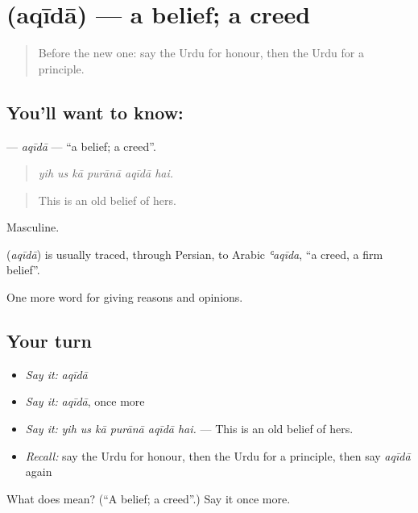 \section[\texorpdfstring{\ur{عقیدہ} (aqīdā)}{عقیدہ (aqīdā)}]{ (aqīdā) — a belief; a creed}

\label{lesson:UR-C345-aqida}



\begin{quote}
Before the new one: say the Urdu for honour, then the Urdu for a principle.
\end{quote}

\subsection*{You'll want to know: }
\textbf{} — \emph{aqīdā} — \textquotedblleft{}a belief; a creed\textquotedblright{}.

\begin{quote}
     
\end{quote}

\begin{quote}
\emph{yih us kā purānā aqīdā hai.}
\end{quote}

\begin{quote}
This is an old belief of hers.
\end{quote}

Masculine.

\begin{cousinweb}
\textbf{} (\emph{aqīdā}) is usually traced, through Persian, to Arabic \emph{ʿaqīda}, \textquotedblleft{}a creed, a firm belief\textquotedblright{}.
\end{cousinweb}

\begin{grammarlens}[title={What you've built}]
One more word for giving reasons and opinions.
\end{grammarlens}

\subsection*{Your turn}
\begin{itemize}
\raggedright
  \item \emph{Say it:} \emph{aqīdā}
  \item \emph{Say it:} \emph{aqīdā}, once more
  \item \emph{Say it:} \emph{yih us kā purānā aqīdā hai.} — This is an old belief of hers.
  \item \emph{Recall:} say the Urdu for honour, then the Urdu for a principle, then say \emph{aqīdā} again
\end{itemize}

\begin{tcolorbox}[breakable,colback=teal!4,colframe=teal!35!black,title={Before you move on}]
What does  mean? (\textquotedblleft{}A belief; a creed\textquotedblright{}.) Say it once more.
\end{tcolorbox}

